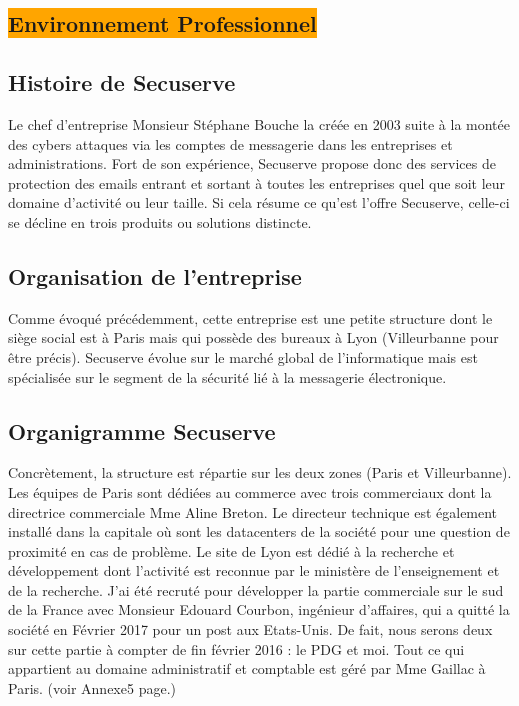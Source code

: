 \begin{center}
\section{\colorbox{orange}{Environnement Professionnel}}
\end{center}


\subsection{Histoire de Secuserve}
Le chef d'entreprise Monsieur Stéphane Bouche la créée en 2003 suite à la montée des cybers attaques via les comptes de messagerie dans les entreprises et administrations. Fort de son expérience, Secuserve propose donc des services de protection des emails entrant et sortant à toutes les entreprises quel que soit leur domaine d'activité ou leur taille. Si cela résume ce qu'est l'offre Secuserve, celle-ci se décline en trois produits ou solutions distincte.

\subsection{Organisation de l'entreprise}
Comme évoqué précédemment, cette entreprise est une petite structure dont le siège social est à Paris mais qui possède des bureaux à Lyon (Villeurbanne pour être précis). 
Secuserve évolue sur le marché global de l’informatique mais est spécialisée sur le segment de la sécurité lié à la messagerie électronique.
\subsection{Organigramme Secuserve}
Concrètement, la structure est répartie sur les deux zones (Paris et Villeurbanne).
Les équipes de Paris sont dédiées au commerce avec trois commerciaux dont la directrice commerciale Mme Aline Breton. Le directeur technique est également installé dans la capitale où sont les datacenters de la société pour une question de proximité en cas de problème. Le site de Lyon est dédié à la recherche et développement dont l’activité est reconnue par le ministère de l’enseignement et de la recherche. J’ai été recruté pour développer la partie commerciale sur le sud de la France avec Monsieur Edouard Courbon, ingénieur d’affaires,  qui a quitté la société en Février 2017 pour un post aux Etats-Unis. De fait, nous serons deux sur cette partie à compter de fin février 2016 : le PDG et moi.
Tout ce qui appartient au domaine administratif et comptable est géré par Mme Gaillac à Paris. (voir Annexe5 page.\pageref{organigramme})

